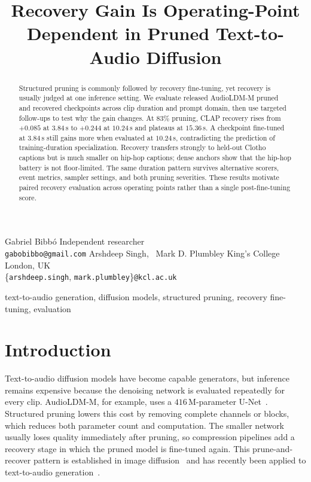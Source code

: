 \documentclass{article}
\begin{document}
\ninept

\title{Recovery Gain Is Operating-Point Dependent in Pruned Text-to-Audio Diffusion}

\twoauthors
  {Gabriel Bibb\'o}
  {Independent researcher \\
   \texttt{gabobibbo@gmail.com}}
  {Arshdeep Singh, \, Mark D. Plumbley}
  {King's College London, UK \\
   \{\texttt{arshdeep.singh}, \texttt{mark.plumbley}\}\texttt{@kcl.ac.uk}}

\maketitle

\begin{abstract}
Structured pruning is commonly followed by recovery fine-tuning, yet recovery is usually judged at one inference setting. We evaluate released AudioLDM-M pruned and recovered checkpoints across clip duration and prompt domain, then use targeted follow-ups to test why the gain changes. At $83\%$ pruning, CLAP recovery rises from $+0.085$ at $3.84$\,s to $+0.244$ at $10.24$\,s and plateaus at $15.36$\,s. A checkpoint fine-tuned at $3.84$\,s still gains more when evaluated at $10.24$\,s, contradicting the prediction of training-duration specialization. Recovery transfers strongly to held-out Clotho captions but is much smaller on hip-hop captions; dense anchors show that the hip-hop battery is not floor-limited. The same duration pattern survives alternative scorers, event metrics, sampler settings, and both pruning severities. These results motivate paired recovery evaluation across operating points rather than a single post-fine-tuning score.
\end{abstract}

\begin{keywords}
text-to-audio generation, diffusion models, structured pruning, recovery fine-tuning, evaluation
\end{keywords}

\section{Introduction}
Text-to-audio diffusion models have become capable generators, but inference remains expensive because the denoising network is evaluated repeatedly for every clip. AudioLDM-M, for example, uses a $416$\,M-parameter U-Net~\cite{liu2023audioldm}. Structured pruning lowers this cost by removing complete channels or blocks, which reduces both parameter count and computation. The smaller network usually loses quality immediately after pruning, so compression pipelines add a recovery stage in which the pruned model is fine-tuned again. This prune-and-recover pattern is established in image diffusion~\cite{fang2023diffpruning,kim2024bksdm,fang2025tinyfusion} and has recently been applied to text-to-audio generation~\cite{singh2026pruning}.
\end{document}
